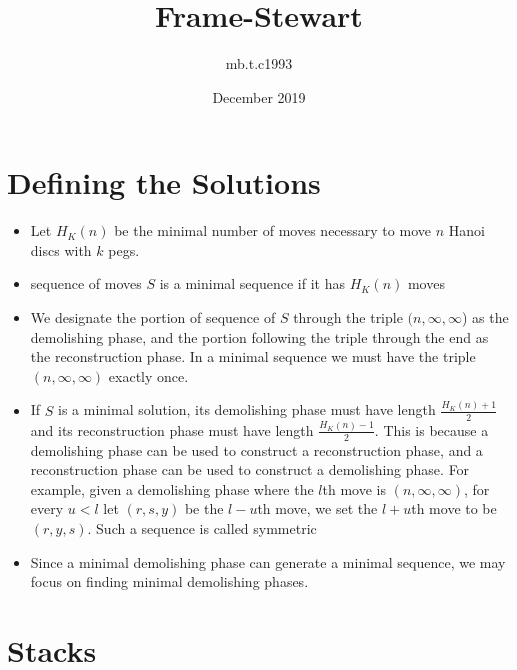 \documentclass{article}
\title{Frame-Stewart}
\author{mb.t.c1993 }
\date{December 2019}
\begin{document}
\maketitle

\section{Defining the Solutions}
\begin{itemize}
    \item Let $H_K(n)$ be the minimal number of moves necessary to move $n$ Hanoi discs with $k$ pegs.

    \item sequence of moves $S$ is a minimal sequence if it has $H_K(n)$ moves

    \item We designate the portion of sequence of $S$ through the triple $(n,\infty,\infty$)  as the demolishing phase, and the portion following the triple through the end as the reconstruction phase. In a minimal sequence we must have the triple $(n,\infty,\infty)$ exactly once.

    \item If $S$ is a minimal solution, its demolishing phase must have length $\frac{H_K(n)+1}{2}$ and its reconstruction phase must have length $\frac{H_K(n)-1}{2}$. This is because a demolishing phase can be used to construct a reconstruction phase, and a reconstruction phase can be used to construct a demolishing phase. For example, given a demolishing phase where the $l$th move is $(n,\infty,\infty)$, for every
    $u<l$ let $(r,s,y)$ be the $l-u$th move, we set the $l+u$th move to be $(r,y,s)$. Such a sequence is called symmetric

    \item Since a minimal demolishing phase can generate a minimal sequence, we may focus on finding minimal demolishing phases.
\end{itemize}

\section{Stacks}
\end{document}
